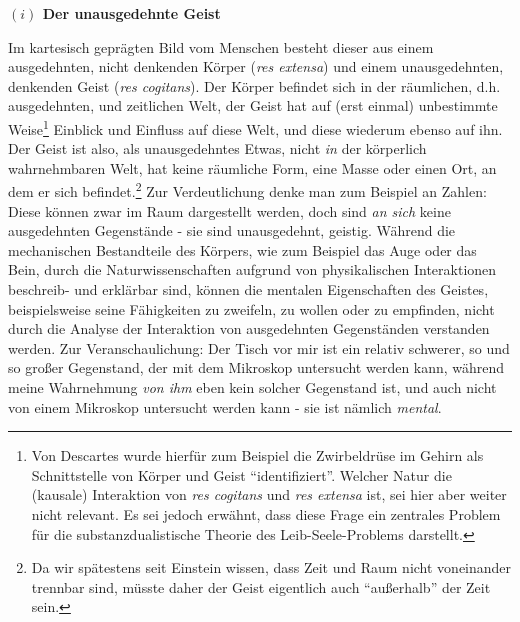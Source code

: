 \documentclass[a4paper, 12pt]{article}
\begin{document}
\begin{onehalfspace}

\vspace{5mm}
\noindent\textbf{$(i)$ Der unausgedehnte Geist}


\noindent Im kartesisch geprägten Bild vom Menschen besteht dieser aus einem ausgedehnten, nicht denkenden Körper (\emph{res extensa}) und einem unausgedehnten, denkenden Geist (\emph{res cogitans}). Der Körper befindet sich in der räumlichen, d.h. ausgedehnten, und zeitlichen Welt, der Geist hat auf (erst einmal) unbestimmte Weise\footnote{Von Descartes wurde hierfür zum Beispiel die Zwirbeldrüse im Gehirn als Schnittstelle von Körper und Geist "`identifiziert"'. Welcher Natur die (kausale) Interaktion von \emph{res cogitans} und \emph{res extensa} ist, sei hier aber weiter nicht relevant. Es sei jedoch erwähnt, dass diese Frage ein zentrales Problem für die substanzdualistische Theorie des Leib-Seele-Problems darstellt.} Einblick und Einfluss auf diese Welt, und diese wiederum ebenso auf ihn. Der Geist ist also, als unausgedehntes Etwas, nicht \emph{in} der körperlich wahrnehmbaren Welt, hat keine räumliche Form, eine Masse oder einen Ort, an dem er sich befindet.\footnote{Da wir spätestens seit Einstein wissen, dass Zeit und Raum nicht voneinander trennbar sind, müsste daher der Geist eigentlich auch "`außerhalb"' der Zeit sein.} Zur Verdeutlichung denke man zum Beispiel an Zahlen: Diese können zwar im Raum dargestellt werden, doch sind \emph{an sich} keine ausgedehnten Gegenstände - sie sind unausgedehnt, geistig. Während die mechanischen Bestandteile des Körpers, wie zum Beispiel das Auge oder das Bein, durch die Naturwissenschaften aufgrund von physikalischen Interaktionen beschreib- und erklärbar sind, können die mentalen Eigenschaften des Geistes, beispielsweise seine Fähigkeiten zu zweifeln, zu wollen oder zu empfinden, nicht durch die Analyse der Interaktion von ausgedehnten Gegenständen verstanden werden. Zur Veranschaulichung: Der Tisch vor mir ist ein relativ schwerer, so und so großer Gegenstand, der mit dem Mikroskop untersucht werden kann, während meine Wahrnehmung \emph{von ihm} eben kein solcher Gegenstand ist, und auch nicht von einem Mikroskop untersucht werden kann - sie ist nämlich \emph{mental}. 


\end{onehalfspace}
\end{document}
